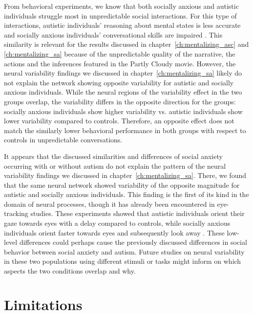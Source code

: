 From behavioral experiments, we know that both socially anxious and autistic individuals struggle most in unpredictable social interactions. For this type of interactions, autistic individuals' reasoning about mental states is less accurate and socially anxious individuals' conversational skills are impaired \citep{roeyers2001,ponnet2008,pilkonis1977,thompson2002}. This similarity is relevant for the results discussed in chapter~\ref{ch:mentalizing_asc} and \ref{ch:mentalizing_sa} because of the unpredictable quality of the narrative, the actions and the inferences featured in the Partly Cloudy movie. However, the neural variability findings we discussed in chapter~\ref{ch:mentalizing_sa} likely do not explain the network showing opposite variability for autistic and socially anxious individuals. While the neural regions of the variability effect in the two groups overlap, the variability differs in the opposite direction for the groups: socially anxious individuals show higher variability vs. autistic individuals show lower variability compared to controls. Therefore, an opposite effect does not match the similarly lower behavioral performance in both groups with respect to controls in unpredictable conversations.

It appears that the discussed similarities and differences of social anxiety occurring with or without autism do not explain the pattern of the neural variability findings we discussed in chapter~\ref{ch:mentalizing_sa}. There, we found that the same neural network showed variability of the opposite magnitude for autistic and socially anxious individuals. This finding is the first of its kind in the domain of neural processes, though it has already been encountered in eye-tracking studies. These experiments showed that autistic individuals orient their gaze towards eyes with a delay compared to controls, while socially anxious individuals orient faster towards eyes and subsequently look away \citep{ni2023,kleberg2017}. These low-level differences could perhaps cause the previously discussed differences in social behavior between social anxiety and autism. Future studies on neural variability in these two populations using different stimuli or tasks might inform on which aspects the two conditions overlap and why.

\section{Limitations}

